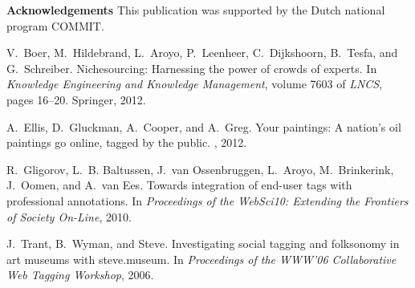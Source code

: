 \documentclass{sig-alternate-2013}
\begin{document}
\noindent\textbf{Acknowledgements}
This publication was supported by the Dutch national program COMMIT. 


\begin{thebibliography}{1}

V.~Boer, M.~Hildebrand, L.~Aroyo, P.~Leenheer, C.~Dijkshoorn, B.~Tesfa, and
  G.~Schreiber.
\newblock Nichesourcing: Harnessing the power of crowds of experts.
\newblock In {\em Knowledge Engineering and Knowledge Management}, volume 7603
  of {\em LNCS}, pages 16--20. Springer, 2012.

A.~Ellis, D.~Gluckman, A.~Cooper, and A.~Greg.
\newblock Your paintings: A nation's oil paintings go online, tagged by the
  public.
, 2012.

R.~Gligorov, L.~B. Baltussen, J.~van Ossenbruggen, L.~Aroyo, M.~Brinkerink,
  J.~Oomen, and A.~van Ees.
\newblock Towards integration of end-user tags with professional annotations.
\newblock In {\em Proceedings of the WebSci10: Extending the Frontiers of
  Society On-Line}, 2010.

J.~Trant, B.~Wyman, and Steve.
\newblock Investigating social tagging and folksonomy in art museums with
  steve.museum.
\newblock In {\em Proceedings of the WWW'06 Collaborative Web Tagging
  Workshop}, 2006.

\end{thebibliography}

\balancecolumns
\end{document}
